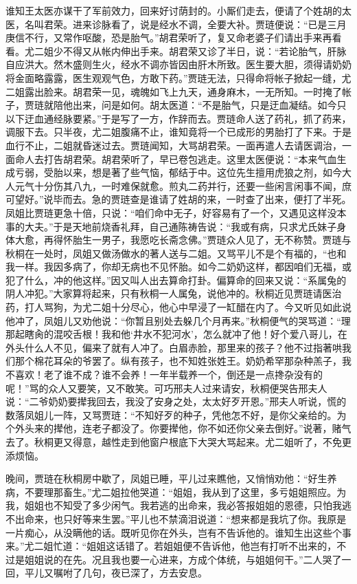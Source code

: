 \begin{parag}


    谁知王太医亦谋干了军前效力，回来好讨荫封的。小厮们走去，便请了个姓胡的太医，名叫君荣。进来诊脉看了，说是经水不调，全要大补。贾琏便说：“已是三月庚信不行，又常作呕酸，恐是胎气。”胡君荣听了，复又命老婆子们请出手来再看看。尤二姐少不得又从帐内伸出手来。胡君荣又诊了半日，说：“若论胎气，肝脉自应洪大。然木盛则生火，经水不调亦皆因由肝木所致。医生要大胆，须得请奶奶将金面略露露，医生观观气色，方敢下药。”贾琏无法，只得命将帐子掀起一缝，尤二姐露出脸来。胡君荣一见，魂魄如飞上九天，通身麻木，一无所知。一时掩了帐子，贾琏就陪他出来，问是如何。胡太医道：“不是胎气，只是迂血凝结。如今只以下迂血通经脉要紧。”于是写了一方，作辞而去。贾琏命人送了药礼，抓了药来，调服下去。只半夜，尤二姐腹痛不止，谁知竟将一个已成形的男胎打了下来。于是血行不止，二姐就昏迷过去。贾琏闻知，大骂胡君荣。一面再遣人去请医调治，一面命人去打告胡君荣。胡君荣听了，早已卷包逃走。这里太医便说：“本来气血生成亏弱，受胎以来，想是著了些气恼，郁结于中。这位先生擅用虎狼之剂，如今大人元气十分伤其八九，一时难保就愈。煎丸二药并行，还要一些闲言闲事不闻，庶可望好。”说毕而去。急的贾琏查是谁请了姓胡的来，一时查了出来，便打了半死。凤姐比贾琏更急十倍，只说：“咱们命中无子，好容易有了一个，又遇见这样没本事的大夫。”于是天地前烧香礼拜，自己通陈祷告说：“我或有病，只求尤氏妹子身体大愈，再得怀胎生一男子，我愿吃长斋念佛。”贾琏众人见了，无不称赞。贾琏与秋桐在一处时，凤姐又做汤做水的著人送与二姐。又骂平儿不是个有福的，“也和我一样。我因多病了，你却无病也不见怀胎。如今二奶奶这样，都因咱们无福，或犯了什么，冲的他这样。”因又叫人出去算命打卦。偏算命的回来又说：“系属兔的阴人冲犯。”大家算将起来，只有秋桐一人属兔，说他冲的。秋桐近见贾琏请医治药，打人骂狗，为尤二姐十分尽心，他心中早浸了一缸醋在内了。今又听见如此说他冲了，凤姐儿又劝他说：“你暂且别处去躲几个月再来。”秋桐便气的哭骂道：“理那起瞎肏的混咬舌根！我和他‘井水不犯河水’，怎么就冲了他！好个爱八哥儿，在外头什么人不见，偏来了就有人冲了。白眉赤脸，那里来的孩子？他不过指著哄我们那个棉花耳朵的爷罢了。纵有孩子，也不知姓张姓王。奶奶希罕那杂种羔子，我不喜欢！老了谁不成？谁不会养！一年半载养一个，倒还是一点搀杂没有的呢！”骂的众人又要笑，又不敢笑。可巧邢夫人过来请安，秋桐便哭告邢夫人说：“二爷奶奶要撵我回去，我没了安身之处，太太好歹开恩。”邢夫人听说，慌的数落凤姐儿一阵，又骂贾琏：“不知好歹的种子，凭他怎不好，是你父亲给的。为个外头来的撵他，连老子都没了。你要撵他，你不如还你父亲去倒好。”说著，赌气去了。秋桐更又得意，越性走到他窗户根底下大哭大骂起来。尤二姐听了，不免更添烦恼。
\end{parag}


\begin{parag}


    晚间，贾琏在秋桐房中歇了，凤姐已睡，平儿过来瞧他，又悄悄劝他：“好生养病，不要理那畜生。”尤二姐拉他哭道：“姐姐，我从到了这里，多亏姐姐照应。为我，姐姐也不知受了多少闲气。我若逃的出命来，我必答报姐姐的恩德，只怕我逃不出命来，也只好等来生罢。”平儿也不禁滴泪说道：“想来都是我坑了你。我原是一片痴心，从没瞒他的话。既听见你在外头，岂有不告诉他的。谁知生出这些个事来。”尤二姐忙道：“姐姐这话错了。若姐姐便不告诉他，他岂有打听不出来的，不过是姐姐说的在先。况且我也要一心进来，方成个体统，与姐姐何干。”二人哭了一回，平儿又嘱咐了几句，夜已深了，方去安息。
\end{parag}


